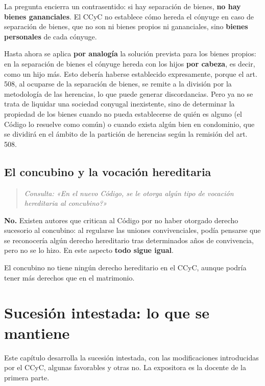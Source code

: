 \documentclass[12pt,oneside]{book}
\begin{document}
La pregunta encierra un contrasentido: si hay separación de bienes, \textbf{no hay bienes gananciales}. El CCyC no establece cómo hereda el cónyuge en caso de separación de bienes, que no son ni bienes propios ni gananciales, sino \textbf{bienes personales} de cada cónyuge.

Hasta ahora se aplica \textbf{por analogía} la solución prevista para los bienes propios: en la separación de bienes el cónyuge hereda con los hijos \textbf{por cabeza}, es decir, como un hijo más. Esto debería haberse establecido expresamente, porque el art. 508, al ocuparse de la separación de bienes, se remite a la división por la metodología de las herencias, lo que puede generar discordancias. Pero ya no se trata de liquidar una sociedad conyugal inexistente, sino de determinar la propiedad de los bienes cuando no pueda establecerse de quién es alguno (el Código lo resuelve como común) o cuando exista algún bien en condominio, que se dividirá en el ámbito de la partición de herencias según la remisión del art. 508.

\section{El concubino y la vocación hereditaria}

\begin{quote}
\textit{Consulta: «En el nuevo Código, \textquestiondown{}se le otorga algún tipo de vocación hereditaria al concubino?»}
\end{quote}

\textbf{No.} Existen autores que critican al Código por no haber otorgado derecho sucesorio al concubino: al regularse las uniones convivenciales, podía pensarse que se reconocería algún derecho hereditario tras determinados años de convivencia, pero no se lo hizo. En este aspecto \textbf{todo sigue igual}.

El concubino no tiene ningún derecho hereditario en el CCyC, aunque podría tener más derechos que en el matrimonio.

\chapter[Sucesión intestada]{Sucesión intestada: lo que se mantiene}

Este capítulo desarrolla la sucesión intestada, con las modificaciones introducidas por el CCyC, algunas favorables y otras no. La expositora es la docente de la primera parte.
\end{document}
